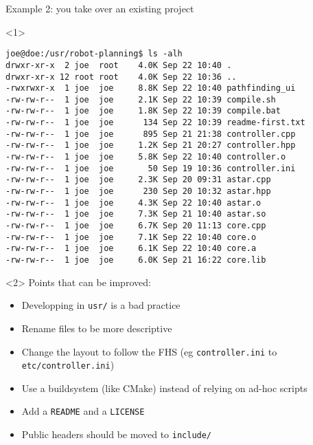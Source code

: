 \documentclass[compress]{beamer}
\begin{document}
\begin{frame}[fragile]{Example 2: you take over an existing project}


\begin{onlyenv}<1>
\begin{verbatim}
joe@doe:/usr/robot-planning$ ls -alh
drwxr-xr-x  2 joe  root    4.0K Sep 22 10:40 .
drwxr-xr-x 12 root root    4.0K Sep 22 10:36 ..
-rwxrwxr-x  1 joe  joe     8.8K Sep 22 10:40 pathfinding_ui
-rw-rw-r--  1 joe  joe     2.1K Sep 22 10:39 compile.sh
-rw-rw-r--  1 joe  joe     1.8K Sep 22 10:39 compile.bat
-rw-rw-r--  1 joe  joe      134 Sep 22 10:39 readme-first.txt
-rw-rw-r--  1 joe  joe      895 Sep 21 21:38 controller.cpp
-rw-rw-r--  1 joe  joe     1.2K Sep 21 20:27 controller.hpp
-rw-rw-r--  1 joe  joe     5.8K Sep 22 10:40 controller.o
-rw-rw-r--  1 joe  joe       50 Sep 19 10:36 controller.ini
-rw-rw-r--  1 joe  joe     2.3K Sep 20 09:31 astar.cpp
-rw-rw-r--  1 joe  joe      230 Sep 20 10:32 astar.hpp
-rw-rw-r--  1 joe  joe     4.3K Sep 22 10:40 astar.o
-rw-rw-r--  1 joe  joe     7.3K Sep 21 10:40 astar.so
-rw-rw-r--  1 joe  joe     6.7K Sep 20 11:13 core.cpp
-rw-rw-r--  1 joe  joe     7.1K Sep 22 10:40 core.o
-rw-rw-r--  1 joe  joe     6.1K Sep 22 10:40 core.a
-rw-rw-r--  1 joe  joe     6.0K Sep 21 16:22 core.lib
\end{verbatim}

\end{onlyenv}

    \begin{onlyenv}<2>
        Points that can be improved:

        \begin{itemize}
            \item Developping in \texttt{usr/} is a bad practice
            \item Rename files to be more descriptive
            \item Change the layout to follow the FHS (eg \texttt{controller.ini} to
                \texttt{etc/controller.ini})
            \item Use a buildsystem (like CMake) instead of relying on ad-hoc scripts
            \item Add a \texttt{README} and a \texttt{LICENSE}
            \item Public headers should be moved to \texttt{include/}
        \end{itemize}
    \end{onlyenv}
\end{frame}
\end{document}

